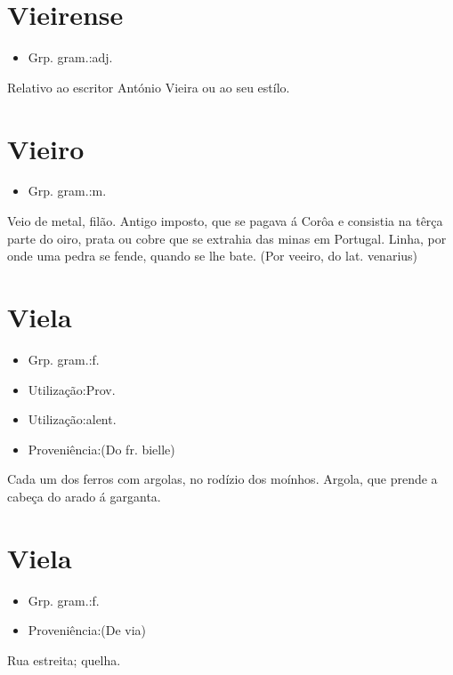 \documentclass{article}
\begin{document}
\section{Vieirense}
\begin{itemize}
\item {Grp. gram.:adj.}
\end{itemize}
Relativo ao escritor António Vieira ou ao seu estílo.
\section{Vieiro}
\begin{itemize}
\item {Grp. gram.:m.}
\end{itemize}
Veio de metal, filão.
Antigo imposto, que se pagava á Corôa e consistia na têrça parte do oiro, prata ou cobre que se extrahia das minas em Portugal.
Linha, por onde uma pedra se fende, quando se lhe bate.
(Por \textunderscore veeiro\textunderscore , do lat. \textunderscore venarius\textunderscore )
\section{Viela}
\begin{itemize}
\item {Grp. gram.:f.}
\end{itemize}
\begin{itemize}
\item {Utilização:Prov.}
\end{itemize}
\begin{itemize}
\item {Utilização:alent.}
\end{itemize}
\begin{itemize}
\item {Proveniência:(Do fr. \textunderscore bielle\textunderscore )}
\end{itemize}
Cada um dos ferros com argolas, no rodízio dos moínhos.
Argola, que prende a cabeça do arado á garganta.
\section{Viela}
\begin{itemize}
\item {Grp. gram.:f.}
\end{itemize}
\begin{itemize}
\item {Proveniência:(De \textunderscore via\textunderscore )}
\end{itemize}
Rua estreita; quelha.
\end{document}

